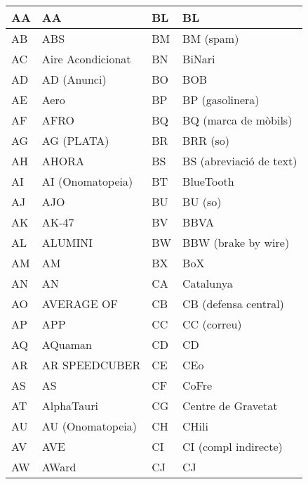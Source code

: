 \begin{table}[h]
    \centering
    \begin{tabular}{|l|l|l|l|}
    \hline
    AA & AA                 & BL & BL                      \\ \hline
    AB & ABS                & BM & BM (spam)               \\ \hline
    AC & Aire Acondicionat  & BN & BiNari                  \\ \hline
    AD & AD (Anunci)        & BO & BOB                     \\ \hline
    AE & Aero               & BP & BP (gasolinera)         \\ \hline
    AF & AFRO               & BQ & BQ (marca de mòbils)    \\ \hline
    AG & AG (PLATA)         & BR & BRR (so)                \\ \hline
    AH & AHORA              & BS & BS (abreviació de text) \\ \hline
    AI & AI (Onomatopeia)   & BT & BlueTooth               \\ \hline
    AJ & AJO                & BU & BU (so)                 \\ \hline
    AK & AK-47              & BV & BBVA                    \\ \hline
    AL & ALUMINI            & BW & BBW (brake by wire)     \\ \hline
    AM & AM                 & BX & BoX                     \\ \hline
    AN & AN                 & CA & Catalunya               \\ \hline
    AO & AVERAGE OF         & CB & CB (defensa central)    \\ \hline
    AP & APP                & CC & CC (correu)             \\ \hline
    AQ & AQuaman            & CD & CD                      \\ \hline
    AR & AR SPEEDCUBER      & CE & CEo                     \\ \hline
    AS & AS                 & CF & CoFre                   \\ \hline
    AT & AlphaTauri         & CG & Centre de Gravetat      \\ \hline
    AU & AU (Onomatopeia)   & CH & CHili                   \\ \hline
    AV & AVE                & CI & CI (compl indirecte)    \\ \hline
    AW & AWard              & CJ & CJ                      \\ \hline

\end{tabular}
\end{table}
